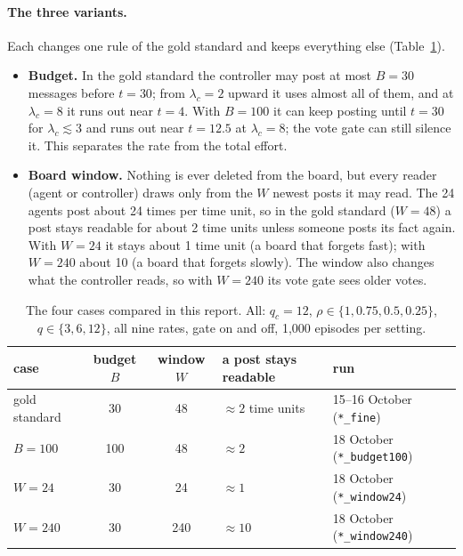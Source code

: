 \documentclass[10pt,a4paper]{article}
\begin{document}
\paragraph{The three variants.} Each changes one rule of the gold standard and keeps everything else
(Table~\ref{tab:cases}).

\begin{itemize}\itemsep1pt
\item \textbf{Budget.} In the gold standard the controller may post at most $B = 30$ messages before $t = 30$; from
  $\lambda_c = 2$ upward it uses almost all of them, and at $\lambda_c = 8$ it runs out near $t = 4$. With $B = 100$
  it can keep posting until $t = 30$ for $\lambda_c \lesssim 3$ and runs out near $t = 12.5$ at $\lambda_c = 8$; the
  vote gate can still silence it. This separates the rate from the total effort.
\item \textbf{Board window.} Nothing is ever deleted from the board, but every reader (agent or controller) draws
  only from the $W$ newest posts it may read. The 24 agents post about 24 times per time unit, so in the gold
  standard ($W = 48$) a post stays readable for about 2 time units unless someone posts its fact again. With
  $W = 24$ it stays about 1 time unit (a board that forgets fast); with $W = 240$ about 10 (a board that forgets
  slowly). The window also changes what the controller reads, so with $W = 240$ its vote gate sees older votes.
\end{itemize}

\begin{table}[H]
\centering\small
\caption{The four cases compared in this report. All: $q_c = 12$, $\rho \in \{1, 0.75, 0.5, 0.25\}$, $q \in \{3, 6, 12\}$,
all nine rates, gate on and off, 1{,}000 episodes per setting.}
\label{tab:cases}
\begin{tabular}{lccll}
\toprule
case & budget $B$ & window $W$ & a post stays readable & run \\
\midrule
gold standard & 30 & 48 & $\approx 2$ time units & 15--16 October (\texttt{*\_fine}) \\
$B = 100$ & 100 & 48 & $\approx 2$ & 18 October (\texttt{*\_budget100}) \\
$W = 24$ & 30 & 24 & $\approx 1$ & 18 October (\texttt{*\_window24}) \\
$W = 240$ & 30 & 240 & $\approx 10$ & 18 October (\texttt{*\_window240}) \\
\bottomrule
\end{tabular}
\end{table}
\end{document}

